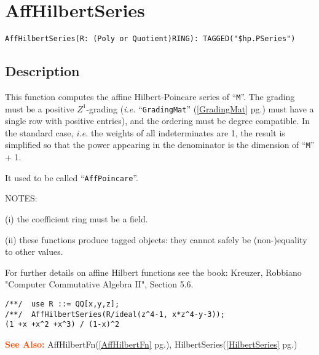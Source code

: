 \documentclass[a4paper]{mybook}
\newenvironment{command}{}{} %
\newcommand\SeeAlso{\par\textcolor{OrangeRed}{\textbf{\large See Also: }}}
\begin{document}
\section{AffHilbertSeries}
\label{AffHilbertSeries}
\begin{command} %


\begin{Verbatim}[label=syntax, rulecolor=\color{MidnightBlue},
frame=single]
AffHilbertSeries(R: (Poly or Quotient)RING): TAGGED("$hp.PSeries")
\end{Verbatim}


\subsection*{Description}

This function computes the affine Hilbert-Poincare series of ``\verb&M&''.
The grading must be a positive $Z^1$-grading (\textit{i.e.} ``\verb&GradingMat&'' (\ref{GradingMat} pg.\pageref{GradingMat})
must have a single row with positive entries), and the ordering must
be degree compatible.
In the standard case, \textit{i.e.} the weights of all
indeterminates are 1, the result is simplified so that the power
appearing in the denominator is the dimension of ``\verb&M&'' + 1.
\par 
It used to be called ``\verb&AffPoincare&''.
\par 
NOTES:
\par (i) the coefficient ring must be a field.
\par (ii) these functions produce tagged objects: they cannot safely be
     (non-)equality to other values.
\par 
For further details on affine Hilbert functions see the book:
Kreuzer, Robbiano "Computer Commutative Algebra II", Section 5.6.
\begin{Verbatim}[label=example, rulecolor=\color{PineGreen}, frame=single]
/**/  use R ::= QQ[x,y,z];
/**/  AffHilbertSeries(R/ideal(z^4-1, x*z^4-y-3));
(1 +x +x^2 +x^3) / (1-x)^2
\end{Verbatim}


\SeeAlso %
  AffHilbertFn(\ref{AffHilbertFn} pg.\pageref{AffHilbertFn}), 
    HilbertSeries(\ref{HilbertSeries} pg.\pageref{HilbertSeries})
\end{command} %
\end{document}
